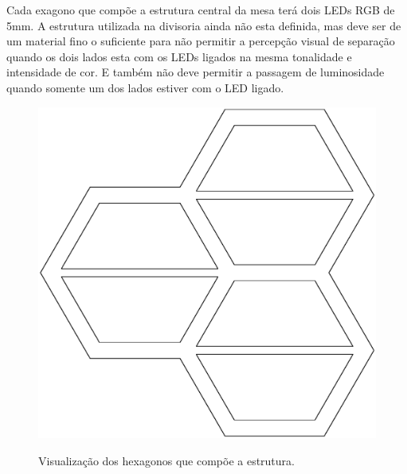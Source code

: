 \documentclass[a4paper,10pt]{article}
\begin{document}
Cada exagono que compõe a estrutura central da mesa terá dois LEDs RGB de 5mm. A estrutura utilizada na divisoria ainda não esta definida, mas deve ser de um material fino o suficiente para não permitir a percepção visual de separação quando os dois lados esta com os LEDs ligados na mesma tonalidade e intensidade de cor. E também não deve permitir a passagem de luminosidade quando somente um dos lados estiver com o LED ligado.

\begin{center}
\begin{figure}[h!]
	\center
	\includegraphics[angle=0, scale=0.25]{./img/prototipo-projeto-mesa-v02-b.ps}
	\label{figura_prototipo}
	\caption{Visualização dos hexagonos que compõe a estrutura.}
\end{figure}
\end{center}
\end{document}
